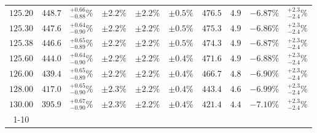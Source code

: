 \begin{table}[ht!]
{{\begin{tabular}{| cc | c | ccc | ccc | c |}
$125.20$ & $448.7$ & $^{+0.66}_{-0.88}\%$ & $\pm 2.2\%$ & {\color{black!55}$\pm 2.2\%$} & {\color{black!55}$\pm 0.5\%$} & $476.5$ & $4.9$ & $-6.87\%$ & $^{+2.3}_{-2.4}\%$ \\
$125.30$ & $447.6$ & $^{+0.64}_{-0.90}\%$ & $\pm 2.2\%$ & {\color{black!55}$\pm 2.2\%$} & {\color{black!55}$\pm 0.5\%$} & $475.3$ & $4.9$ & $-6.86\%$ & $^{+2.3}_{-2.4}\%$ \\
$125.38$ & $446.6$ & $^{+0.65}_{-0.89}\%$ & $\pm 2.2\%$ & {\color{black!55}$\pm 2.2\%$} & {\color{black!55}$\pm 0.5\%$} & $474.3$ & $4.9$ & $-6.87\%$ & $^{+2.3}_{-2.4}\%$ \\
$125.60$ & $444.0$ & $^{+0.64}_{-0.90}\%$ & $\pm 2.2\%$ & {\color{black!55}$\pm 2.2\%$} & {\color{black!55}$\pm 0.4\%$} & $471.6$ & $4.9$ & $-6.88\%$ & $^{+2.3}_{-2.4}\%$ \\
$126.00$ & $439.4$ & $^{+0.65}_{-0.89}\%$ & $\pm 2.2\%$ & {\color{black!55}$\pm 2.2\%$} & {\color{black!55}$\pm 0.4\%$} & $466.7$ & $4.8$ & $-6.90\%$ & $^{+2.3}_{-2.4}\%$ \\
$128.00$ & $417.0$ & $^{+0.65}_{-0.90}\%$ & $\pm 2.3\%$ & {\color{black!55}$\pm 2.2\%$} & {\color{black!55}$\pm 0.4\%$} & $443.4$ & $4.6$ & $-6.99\%$ & $^{+2.3}_{-2.4}\%$ \\
$130.00$ & $395.9$ & $^{+0.67}_{-0.90}\%$ & $\pm 2.3\%$ & {\color{black!55}$\pm 2.2\%$} & {\color{black!55}$\pm 0.4\%$} & $421.4$ & $4.4$ & $-7.10\%$ & $^{+2.3}_{-2.4}\%$ \\
\cline{1-10}
\end{tabular}
}
}
\end{table}

